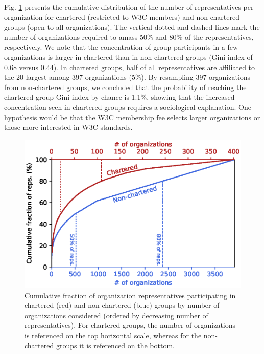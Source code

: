 \documentclass[sigconf, nonacm]{acmart}              %
\begin{document}
Fig. \ref{fig:reps-cum-fracs} presents the cumulative distribution of the number of representatives per organization for chartered (restricted to W3C members) and non-chartered groups (open to all organizations). The vertical dotted and dashed lines mark the number of organizations required to amass 50\% and 80\% of the representatives, respectively. We note that the concentration of group participants in a few organizations is larger in chartered than in non-chartered groups (Gini index of 0.68 versus 0.44). In chartered groups, half of all representatives are affiliated to the 20 largest among 397 organizations (5\%). By resampling 397 organizations from non-chartered groups, we concluded that the probability of reaching the chartered group Gini index by chance is 1.1\%, showing that the increased concentration seen in chartered groups requires a sociological explanation. One hypothesis would be that the W3C membership fee selects larger organizations or those more interested in W3C standards.

\begin{figure}[ht]
  \centering
  \includegraphics[width=1.0\columnwidth]{images/org-reps-cum-fracs.eps}
  \caption{Cumulative fraction of organization representatives participating in chartered (red) and non-chartered (blue) groups by number of organizations considered (ordered by decreasing number of representatives). For chartered groups, the number of organizations is referenced on the top horizontal scale, whereas for the non-chartered groups it is referenced on the bottom.}
  \label{fig:reps-cum-fracs}
\end{figure}
\end{document}
